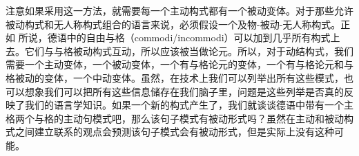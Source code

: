 注意如果采用这一方法，就需要每一个主动构式都有一个被动变体。对于那些允许被动构式和无人称构式组合的语言来说，必须假设一个及物-被动-无人称构式。正如 所说，德语中的自由与格（commodi/incommodi）可以加到几乎所有构式上去。它们与与格被动构式互动，所以应该被当做论元。所以，对于动结构式，我们需要一个主动变体，一个被动变体，一个有与格论元的变体，一个有与格论元和与格被动的变体，一个中动变体。虽然，在技术上我们可以列举出所有这些模式，也可以想象我们可以把所有这些信息储存在我们脑子里，问题是这些列举是否真的反映了我们的语言学知识。如果一个新的构式产生了，我们就谈谈德语中带有一个主格两个与格的主动句模式吧，那么该句子模式有被动形式吗？虽然在主动和被动构式之间建立联系的观点会预测该句子模式会有被动形式，但是实际上没有这种可能。

